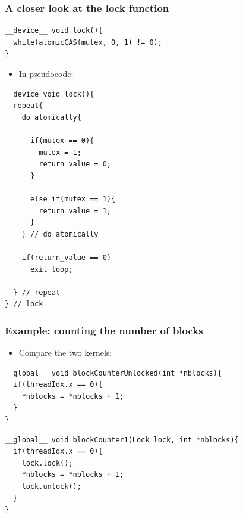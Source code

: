 \documentclass[handout]{beamer}
\numberwithin{equation}{section}
\begin{document}
\begin{frame}[fragile]
\frametitle{A closer look at the lock function}
\begin{lstlisting}[firstnumber=15]
__device__ void lock(){
  while(atomicCAS(mutex, 0, 1) != 0);
}
\end{lstlisting}

\begin{itemize}
\pause \item In pseudocode:
\end{itemize}

\lstset{basicstyle=\tiny}

\begin{lstlisting}
__device void lock(){
  repeat{
    do atomically{
      
      if(mutex == 0){
        mutex = 1;
        return_value = 0;
      }
      
      else if(mutex == 1){
        return_value = 1;
      }
    } // do atomically
    
    if(return_value == 0)
      exit loop;

  } // repeat
} // lock

\end{lstlisting}
\end{frame}



\begin{frame}[fragile]
\frametitle{Example: counting the number of blocks}

\begin{itemize}
\pause \item Compare the two kernels:
\end{itemize}



\pause \begin{lstlisting}[firstnumber=5]
__global__ void blockCounterUnlocked(int *nblocks){
  if(threadIdx.x == 0){
    *nblocks = *nblocks + 1;
  }
}
\end{lstlisting}

\pause \begin{lstlisting}[firstnumber=11]
__global__ void blockCounter1(Lock lock, int *nblocks){
  if(threadIdx.x == 0){
    lock.lock();
    *nblocks = *nblocks + 1;
    lock.unlock();
  }
}
\end{lstlisting}
\end{frame}
\end{document}

